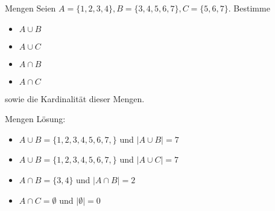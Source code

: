 \documentclass[]{beamer}
\begin{document}
\begin{frame}{Mengen}
	Seien $A=\{1,2,3,4\}, B=\{3,4,5,6,7\}, C=\{5,6,7\}$. Bestimme
	\begin{itemize}
		\item $A \cup B$
		\item $A \cup C$
		\item $A \cap B$
		\item $A \cap C$
	\end{itemize}
	sowie die Kardinalität dieser Mengen.
\end{frame}
\begin{frame}{Mengen}
	Lösung:
	\begin{itemize}
		\item $A \cup B = \{1,2,3,4,5,6,7,\}$ und $\mid A \cup B\mid = 7$
		\pause
		\item $A \cup B = \{1,2,3,4,5,6,7,\}$ und $\mid A \cup C\mid = 7$
		\pause
		\item $A \cap B = \{3,4\}$ und $\mid A \cap B \mid = 2$
		\pause
		\item $A \cap C = \emptyset$ und $\mid\emptyset\mid = 0$
	\end{itemize}
\end{frame}
\end{document}
